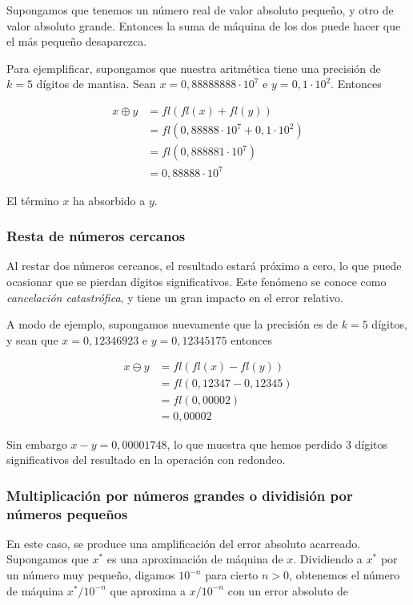 Supongamos que tenemos un número real de valor absoluto pequeño, y otro de valor absoluto grande. Entonces la suma de máquina de los dos puede hacer que el más pequeño desaparezca.

Para ejemplificar, supongamos que nuestra aritmética tiene una precisión de $k = 5$ dígitos de mantisa. Sean $x = 0,88888888 \cdot 10^7$ e $y = 0,1 \cdot 10^2$. Entonces

\begin{align*}
x \oplus y &= fl(fl(x) + fl(y))\\
&= fl(0,88888 \cdot 10^7 + 0,1 \cdot 10^2)\\
&= fl(0,888881 \cdot 10^7)\\
&= 0,88888 \cdot 10^7
\end{align*}

El término $x$ ha absorbido a $y$. 

\subsubsection{Resta de números cercanos}

Al restar dos números cercanos, el resultado estará próximo a cero, lo que puede ocasionar que se pierdan dígitos significativos. Este fenómeno se conoce como \emph{cancelación catastrófica}, y tiene un gran impacto en el error relativo.

A modo de ejemplo, supongamos nuevamente que la precisión es de $k = 5$ dígitos, y sean que $x = 0,12346923$ e $y = 0,12345175$ entonces

\begin{align*}
x \ominus y &= fl(fl(x) - fl(y))\\
&= fl(0,12347 - 0,12345)\\
&= fl(0,00002)\\
&= 0,00002
\end{align*}

Sin embargo $x - y = 0,00001748$, lo que muestra que hemos perdido 3 dígitos significativos del resultado en la operación con redondeo.

\subsubsection{Multiplicación por números grandes o dividisión por números pequeños}

En este caso, se produce una amplificación del error absoluto acarreado. Supongamos que $x^*$ es una aproximación de máquina de $x$. Dividiendo a $x^*$ por un número muy pequeño, digamos $10^{-n}$ para cierto $n > 0$, obtenemos el número de máquina $x^* / 10^{-n}$ que aproxima a $x / 10^{-n}$ con un error absoluto de

